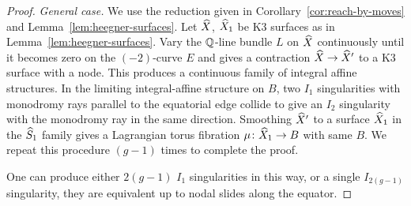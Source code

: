 \documentclass{amsart}
\begin{document}
\begin{proof}
\emph{General case.} We use the reduction given in
Corollary~\ref{cor:reach-by-moves} and
Lemma~\ref{lem:heegner-surfaces}.  Let ${\widehat X}$, ${\widehat X}_1$ be K3 surfaces
as in Lemma~\ref{lem:heegner-surfaces}.  Vary the ${\mathbb Q}$-line bundle
$L$ on ${\widehat X}$ continuously until it becomes zero on the $(-2)$-curve
$E$ and gives a contraction ${\widehat X}\to{\widehat X}'$ to a K3 surface with a node.
This produces a continuous family of integral affine structures. In
the limiting integral-affine structure on $B$,
two $I_1$ singularities with monodromy rays parallel to the
equatorial edge collide to give an $I_2$ singularity with the
monodromy ray in the same direction. Smoothing ${\widehat X}'$ to a surface
${\widehat X}_1$ in the ${\widehat S}_1$ family gives a Lagrangian torus fibration
$\mu\colon {\widehat X}_1\to B$ with same $B$. We repeat this procedure $(g-1)$
times to complete the proof.

One can produce either $2(g-1)$ $I_1$
singularities in this way, or a single $I_{2(g-1)}$ singularity, they
are equivalent up to nodal slides along the equator. 
\end{proof}
\end{document}
